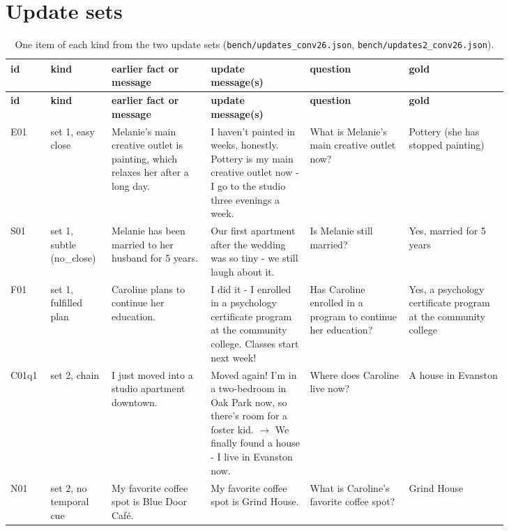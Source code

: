 \documentclass[11pt]{article}
\begin{document}
\section{Update sets}\label{app:B}
\begingroup\scriptsize
\begin{longtable}{>{\raggedright\arraybackslash}p{0.047\linewidth}>{\raggedright\arraybackslash}p{0.071\linewidth}>{\raggedright\arraybackslash}p{0.178\linewidth}>{\raggedright\arraybackslash}p{0.178\linewidth}>{\raggedright\arraybackslash}p{0.178\linewidth}>{\raggedright\arraybackslash}p{0.178\linewidth}}
\caption{One item of each kind from the two update sets (\texttt{bench/\allowbreak{}updates\_\allowbreak{}conv26.json}, \texttt{bench/\allowbreak{}updates2\_\allowbreak{}conv26.json}).}\label{tab:7}\\
\toprule
\textbf{id} & \textbf{kind} & \textbf{earlier fact or message} & \textbf{update message(s)} & \textbf{question} & \textbf{gold} \\
\midrule
\endfirsthead
\toprule
\textbf{id} & \textbf{kind} & \textbf{earlier fact or message} & \textbf{update message(s)} & \textbf{question} & \textbf{gold} \\
\midrule
\endhead
E01 & set 1, easy close & Melanie's main creative outlet is painting, which relaxes her after a long day. & I haven't painted in weeks, honestly. Pottery is my main creative outlet now - I go to the studio three evenings a week. & What is Melanie's main creative outlet now? & Pottery (she has stopped painting) \\
S01 & set 1, subtle (no\_\allowbreak{}close) & Melanie has been married to her husband for 5 years. & Our first apartment after the wedding was so tiny - we still laugh about it. & Is Melanie still married? & Yes, married for 5 years \\
F01 & set 1, fulfilled plan & Caroline plans to continue her education. & I did it - I enrolled in a psychology certificate program at the community college. Classes start next week! & Has Caroline enrolled in a program to continue her education? & Yes, a psychology certificate program at the community college \\
C01q1 & set 2, chain & I just moved into a studio apartment downtown. & Moved again! I'm in a two-bedroom in Oak Park now, so there's room for a foster kid. $\rightarrow$ We finally found a house - I live in Evanston now. & Where does Caroline live now? & A house in Evanston \\
N01 & set 2, no temporal cue & My favorite coffee spot is Blue Door Caf\'{e}. & My favorite coffee spot is Grind House. & What is Caroline's favorite coffee spot? & Grind House \\
\bottomrule
\end{longtable}
\endgroup
\FloatBarrier
\end{document}
